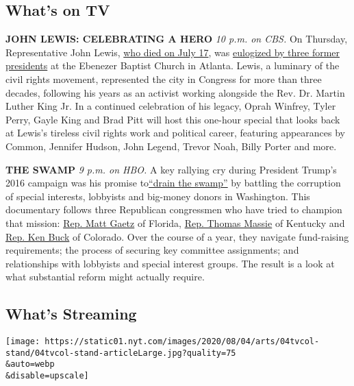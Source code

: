 \hypertarget{whats-on-tv}{%
\subsection{What's on TV}\label{whats-on-tv}}

\textbf{JOHN LEWIS: CELEBRATING A HERO} \emph{10 p.m. on CBS.} On
Thursday, Representative John Lewis,
\href{https://www.nytimes.com/2020/07/17/us/john-lewis-dead.html}{who
died on July 17}, was
\href{https://www.nytimes.com/2020/07/30/us/john-lewis-live-funeral.html?searchResultPosition=8}{eulogized
by three former presidents} at the Ebenezer Baptist Church in Atlanta.
Lewis, a luminary of the civil rights movement, represented the city in
Congress for more than three decades, following his years as an activist
working alongside the Rev. Dr. Martin Luther King Jr. In a continued
celebration of his legacy, Oprah Winfrey, Tyler Perry, Gayle King and
Brad Pitt will host this one-hour special that looks back at Lewis's
tireless civil rights work and political career, featuring appearances
by Common, Jennifer Hudson, John Legend, Trevor Noah, Billy Porter and
more.

\textbf{THE SWAMP} \emph{9 p.m. on HBO.} A key rallying cry during
President Trump's 2016 campaign was his promise
to\href{https://www.nytimes.com/2020/07/06/us/politics/trump-lobbyists-swamp-campaign.html}{``drain
the swamp''} by battling the corruption of special interests, lobbyists
and big-money donors in Washington. This documentary follows three
Republican congressmen who have tried to champion that mission:
\href{https://www.nytimes.com/2019/03/30/us/politics/matt-gaetz-trump.html}{Rep.
Matt Gaetz} of Florida,
\href{https://www.nytimes.com/2020/03/27/us/politics/thomas-massie-coronavirus.html?searchResultPosition=5}{Rep.
Thomas Massie} of Kentucky and
\href{https://www.nytimes.com/2019/04/03/us/politics/trump-republican-party.html?searchResultPosition=12}{Rep.
Ken Buck} of Colorado. Over the course of a year, they navigate
fund-raising requirements; the process of securing key committee
assignments; and relationships with lobbyists and special interest
groups. The result is a look at what substantial reform might actually
require.

\hypertarget{whats-streaming}{%
\subsection{What's Streaming}\label{whats-streaming}}

\texttt{[image: https://static01.nyt.com/images/2020/08/04/arts/04tvcol-stand/04tvcol-stand-articleLarge.jpg?quality=75\\\&auto=webp\\\&disable=upscale]}

